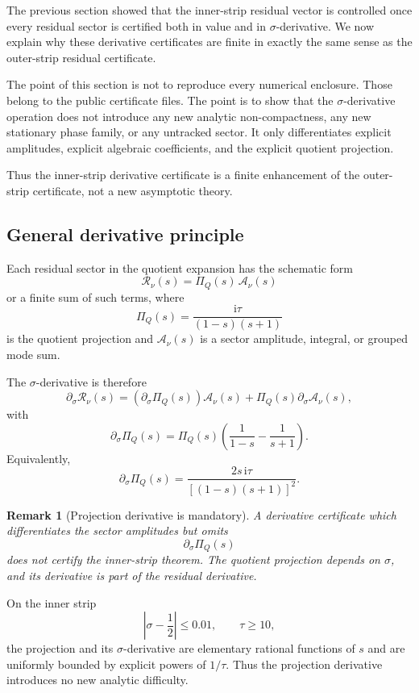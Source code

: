 \documentclass[11pt]{article}
\newtheorem{remark}[theorem]{Remark}
\newcommand{\ii}{\mathrm{i}}
\begin{document}
The previous section showed that the inner-strip residual vector is controlled
once every residual sector is certified both in value and in
\(\sigma\)-derivative.  We now explain why these derivative certificates are
finite in exactly the same sense as the outer-strip residual certificate.

The point of this section is not to reproduce every numerical enclosure.
Those belong to the public certificate files.  The point is to show that the
\(\sigma\)-derivative operation does not introduce any new analytic
non-compactness, any new stationary phase family, or any untracked sector.  It
only differentiates explicit amplitudes, explicit algebraic coefficients, and
the explicit quotient projection.

Thus the inner-strip derivative certificate is a finite enhancement of the
outer-strip certificate, not a new asymptotic theory.

\subsection{General derivative principle}

Each residual sector in the quotient expansion has the schematic form
\[
        \mathcal R_\nu(s)
        =
        \Pi_Q(s)\,
        \mathcal A_\nu(s)
\]
or a finite sum of such terms, where
\[
        \Pi_Q(s)
        =
        \frac{\ii\tau}{(1-s)(s+1)}
\]
is the quotient projection and \(\mathcal A_\nu(s)\) is a sector amplitude,
integral, or grouped mode sum.

The \(\sigma\)-derivative is therefore
\[
        \partial_\sigma \mathcal R_\nu(s)
        =
        (\partial_\sigma\Pi_Q(s))\mathcal A_\nu(s)
        +
        \Pi_Q(s)\partial_\sigma\mathcal A_\nu(s),
\]
with
\[
        \partial_\sigma\Pi_Q(s)
        =
        \Pi_Q(s)
        \left(
        \frac1{1-s}
        -
        \frac1{s+1}
        \right).
\]
Equivalently,
\[
        \partial_\sigma\Pi_Q(s)
        =
        \frac{2s\,\ii\tau}{[(1-s)(s+1)]^2}.
\]

\begin{remark}[Projection derivative is mandatory]
A derivative certificate which differentiates the sector amplitudes but omits
\[
        \partial_\sigma\Pi_Q(s)
\]
does not certify the inner-strip theorem.  The quotient projection depends on
\(\sigma\), and its derivative is part of the residual derivative.
\end{remark}

On the inner strip
\[
        \left|\sigma-\frac12\right|\le0.01,
        \qquad
        \tau\ge10,
\]
the projection and its \(\sigma\)-derivative are elementary rational functions
of \(s\) and are uniformly bounded by explicit powers of \(1/\tau\).  Thus the
projection derivative introduces no new analytic difficulty.
\end{document}
